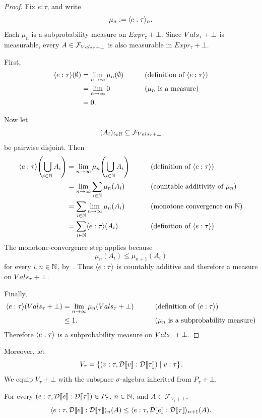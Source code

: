 \begin{proof}
Fix \(e:\tau\), and write
\[
\mu_n:=\langle e:\tau \rangle_{n}.
\]
Each \(\mu_n\) is a subprobability measure on \(Expr_\tau+\bot\). Since
\(Vals_\tau+\bot\) is measurable, every
\(A\in\mathcal F_{Vals_\tau+\bot}\) is also measurable in
\(Expr_\tau+\bot\).

First,
\begin{align*}
\bigsem{e:\tau}(\emptyset)
&=
\lim_{n\to\infty}\mu_n(\emptyset)
&& \tag{definition of \(\bigsem{e:\tau}\)}
\\
&=
\lim_{n\to\infty}0
&& \tag{\(\mu_n\) is a measure}
\\
&=0.
\end{align*}

Now let
\[
(A_i)_{i\in\mathbb{N}}\subseteq\mathcal F_{Vals_\tau+\bot}
\]
be pairwise disjoint. Then
\begin{align*}
\bigsem{e:\tau}\!\left(\bigcup_{i\in\Nats}A_i\right)
&=
\lim_{n\to\infty}
\mu_n\!\left(\bigcup_{i\in\Nats}A_i\right)
&& \tag{definition of \(\bigsem{e:\tau}\)}
\\
&=
\lim_{n\to\infty}
\sum_{i\in\Nats}\mu_n(A_i)
&& \tag{countable additivity of \(\mu_n\)}
\\
&=
\sum_{i\in\Nats}
\lim_{n\to\infty}\mu_n(A_i)
&& \tag{monotone convergence on \(\Nats\)}
\\
&=
\sum_{i\in\Nats}\bigsem{e:\tau}(A_i).
&& \tag{definition of \(\bigsem{e:\tau}\)}
\end{align*}
The monotone-convergence step applies because
\[
\mu_n(A_i)\leq\mu_{n+1}(A_i)
\]
for every \(i,n\in\mathbb{N}\), by~. Thus
\(\langle e:\tau \rangle\) is countably additive and therefore a measure on
\(Vals_\tau+\bot\).

Finally,
\begin{align*}
\bigsem{e:\tau}(\vals_\tau+\bot)
&=
\lim_{n\to\infty}\mu_n(\vals_\tau+\bot)
&& \tag{definition of \(\bigsem{e:\tau}\)}
\\
&\leq 1.
&& \tag{\(\mu_n\) is a subprobability measure}
\end{align*}
Therefore \(\langle e:\tau \rangle\) is a subprobability measure on
\(Vals_\tau+\bot\).
\end{proof}


Moreover, let
\[
V_\tau
=
\{(v:\tau,\mathcal{D}\llbracket v \rrbracket:\mathcal{D}\llbracket \tau \rrbracket)\mid v:\tau\}.
\]
We equip $V_\tau+\bot$ with the subspace $\sigma$-algebra inherited
from $P_\tau+\bot$.

\begin{lemma}
\label{lem:bigstepsem-pairing}
For every $(e:\tau,\mathcal{D}\llbracket e \rrbracket:\mathcal{D}\llbracket \tau \rrbracket)\in P_\tau$,
$n\in\mathbb{N}$, and $A\in\mathcal F_{V_\tau+\bot}$,
\[
\langle e:\tau,\mathcal{D}\llbracket e \rrbracket:\mathcal{D}\llbracket \tau \rrbracket \rangle_{n}(A)
\leq
\langle e:\tau,\mathcal{D}\llbracket e \rrbracket:\mathcal{D}\llbracket \tau \rrbracket \rangle_{n+1}(A).
\]
\end{lemma}

